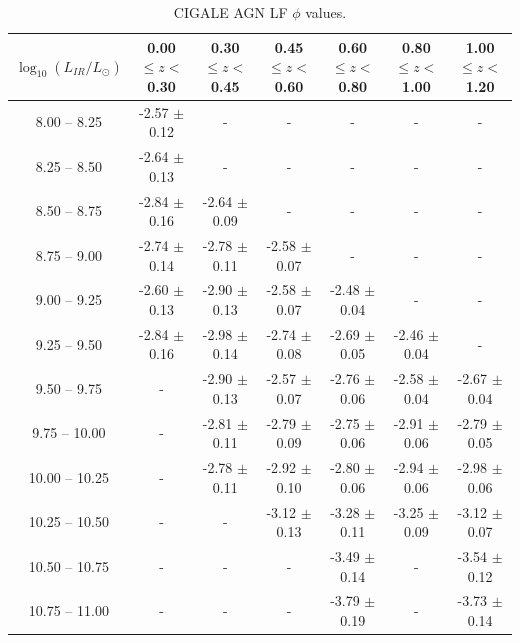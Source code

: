 \begin{landscape}
    \begin{table}
    \begin{center}
    \caption{CIGALE AGN LF $\phi$ values.}
    \label{Tab: CG AGN LF}
    \begin{tabular}{@{}ccccccc@{}}
        \toprule
        $\log_{10}(L_{IR}/L_{\odot})$ & 0.00 $\leq z <$ 0.30 & 0.30 $\leq z <$ 0.45 & 0.45 $\leq z <$ 0.60 & 0.60 $\leq z <$ 0.80 & 0.80 $\leq z <$ 1.00 & 1.00 $\leq z <$ 1.20 \\
        \hline
         8.00 --  8.25 & -2.57 $\pm$ 0.12 & -                & -                & -                & -                & - \\
         8.25 --  8.50 & -2.64 $\pm$ 0.13 & -                & -                & -                & -                & - \\
         8.50 --  8.75 & -2.84 $\pm$ 0.16 & -2.64 $\pm$ 0.09 & -                & -                & -                & - \\
         8.75 --  9.00 & -2.74 $\pm$ 0.14 & -2.78 $\pm$ 0.11 & -2.58 $\pm$ 0.07 & -                & -                & - \\
         9.00 --  9.25 & -2.60 $\pm$ 0.13 & -2.90 $\pm$ 0.13 & -2.58 $\pm$ 0.07 & -2.48 $\pm$ 0.04 & -                & - \\
         9.25 --  9.50 & -2.84 $\pm$ 0.16 & -2.98 $\pm$ 0.14 & -2.74 $\pm$ 0.08 & -2.69 $\pm$ 0.05 & -2.46 $\pm$ 0.04 & - \\
         9.50 --  9.75 & -                & -2.90 $\pm$ 0.13 & -2.57 $\pm$ 0.07 & -2.76 $\pm$ 0.06 & -2.58 $\pm$ 0.04 & -2.67 $\pm$ 0.04 \\
         9.75 -- 10.00 & -                & -2.81 $\pm$ 0.11 & -2.79 $\pm$ 0.09 & -2.75 $\pm$ 0.06 & -2.91 $\pm$ 0.06 & -2.79 $\pm$ 0.05 \\
        10.00 -- 10.25 & -                & -2.78 $\pm$ 0.11 & -2.92 $\pm$ 0.10 & -2.80 $\pm$ 0.06 & -2.94 $\pm$ 0.06 & -2.98 $\pm$ 0.06 \\
        10.25 -- 10.50 & -                & -                & -3.12 $\pm$ 0.13 & -3.28 $\pm$ 0.11 & -3.25 $\pm$ 0.09 & -3.12 $\pm$ 0.07 \\
        10.50 -- 10.75 & -                & -                & -                & -3.49 $\pm$ 0.14 & -                & -3.54 $\pm$ 0.12 \\
        10.75 -- 11.00 & -                & -                & -                & -3.79 $\pm$ 0.19 & -                & -3.73 $\pm$ 0.14 \\

\end{tabular}
\end{center}
\end{table}
\end{landscape}
